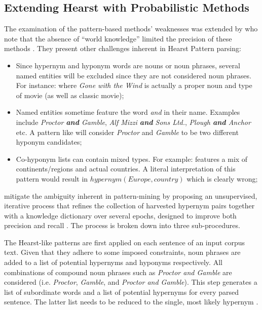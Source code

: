 \subsection{Extending Hearst with Probabilistic Methods}
The examination of the pattern-based methods’ weaknesses was extended by \citeauthor{Wang2017} who note that the absence of “world knowledge” limited the precision of these methods \citep{Wang2017}.   They present other challenges inherent in Hearst Pattern parsing:
\begin{itemize}
    \item Since hypernym and hyponym words are nouns or noun phrases, several named entities will be excluded since they are not considered noun phrases.  For instance:  where \textit{Gone with the Wind} is actually a proper noun and type of movie (as well as classic movie);
    \item Named entities sometime feature the word \textit{and} in their name.  Examples include \textit{Proctor \textbf{and} Gamble}, \textit{Alf Mizzi \textbf{and} Sons Ltd.}, \textit{Plough \textbf{and} Anchor} etc. A pattern like  will consider \textit{Proctor} and \textit{Gamble} to be two different hyponym candidates;
    \item Co-hyponym lists can contain mixed types.  For example:  features a mix of continents/regions and actual countries.  A literal interpretation of this pattern would result in \(hypernym(Europe, country)\) which is clearly wrong;
\end{itemize}

\citeauthor{Wang2017} mitigate the ambiguity inherent in pattern-mining by proposing an unsupervised, iterative process that refines the collection of harvested hypernym pairs together with a knowledge dictionary over several epochs, designed to improve both precision and recall \citep{Wang2017}.  The process is broken down into three sub-procedures.  

The Hearst-like patterns are first applied on each sentence of an input corpus text.  Given that they adhere to some imposed constraints, noun phrases are added to a list of potential hypernyms and hyponyms respectively.  All combinations of compound noun phrases such as \textit{Proctor and Gamble} are considered (i.e. \textit{Proctor}, \textit{Gamble}, and \textit{Proctor and Gamble}).  This step generates a list of subordinate words and a list of potential hypernyms for every parsed sentence.  The latter list needs to be reduced to the single, most likely hypernym \citep{Wang2017}.

